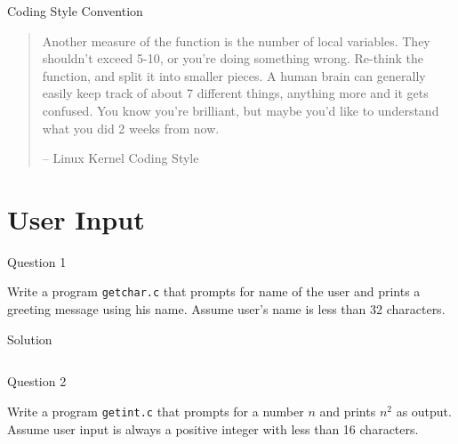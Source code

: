 \documentclass[compress]{beamer}
\begin{document}
\begin{slide}
	\begin{block}{Coding Style Convention}

	\begin{quotation} \scriptsize \normalfont

	Another measure of the function is the number of local variables.
	They shouldn't exceed 5-10, or you're doing something wrong.
	Re-think the function, and split it into smaller pieces.
	A human brain can generally easily keep track of about 7 different things, anything more and it gets confused.
	You know you're brilliant, but maybe you'd like to understand what you did 2 weeks from now.

	\begin{flushright}-- Linux Kernel Coding Style\end{flushright}
	
	\end{quotation}

	\end{block}
\end{slide}

\section{User Input}

\begin{slide}
	\begin{block}{Question 1}

	Write a program \texttt{getchar.c} that prompts for name of the user and prints a greeting message using his name.
	Assume user's name is less than 32 characters.

	\end{block}
\end{slide}

\begin{slide}
	\begin{block}{Solution}

	\inputminted[fontsize=\scriptsize,firstline=10,lastline=27,linenos]{c}{
		\resDirectory/ls07-getchar.c
	}

	\end{block}
\end{slide}

\begin{slide}
	\begin{block}{Question 2}

	Write a program \texttt{getint.c} that prompts for a number $n$ and prints $n^2$ as output.
	Assume user input is always a positive integer with less than 16 characters.

	\end{block}
\end{slide}
\end{document}
